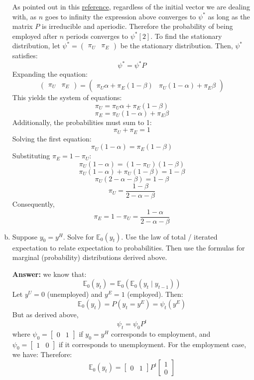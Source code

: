 \documentclass[11pt]{extarticle}
\theoremstyle{plain}
\theoremstyle{definition}
\begin{document}
\begin{enumerate}[(a)]
As pointed out in this \href{https://math.stackexchange.com/questions/588251/proof-that-markov-chains-converges-to-the-stationary-distribution}{reference}, regardless of the initial vector we are dealing with, as $n$ goes to infinity the expression above converges to $\psi^*$ as long as the matrix $P$ is irreducible and aperiodic. Therefore the probability of being employed after $n$ periods converges to $\psi^*[2]$. To find the stationary distribution, let $\psi^* = \begin{pmatrix} \pi_U & \pi_E \end{pmatrix}$ be the stationary distribution. Then, $\psi^*$ satisfies:
    \[
    \psi^* = \psi^* P
    \]
    Expanding the equation:
    \[
    \begin{pmatrix} \pi_U & \pi_E \end{pmatrix} = \begin{pmatrix} \pi_U \alpha + \pi_E (1 - \beta) & \pi_U (1 - \alpha) + \pi_E \beta \end{pmatrix}
    \]
    This yields the system of equations:
    \[
    \pi_U = \pi_U \alpha + \pi_E (1 - \beta)
    \]
    \[
    \pi_E = \pi_U (1 - \alpha) + \pi_E \beta
    \]
    Additionally, the probabilities must sum to 1:
    \[
    \pi_U + \pi_E = 1
    \]
    Solving the first equation:
    \[
    \pi_U (1 - \alpha) = \pi_E (1 - \beta)
    \]
    Substituting $\pi_E = 1 - \pi_U$:
    \[
    \pi_U (1 - \alpha) = (1 - \pi_U) (1 - \beta)
    \]
    \[
    \pi_U (1 - \alpha) + \pi_U (1 - \beta) = 1 - \beta
    \]
    \[
    \pi_U (2 - \alpha - \beta) = 1 - \beta
    \]
    \[
    \pi_U = \frac{1 - \beta}{2 - \alpha - \beta}
    \]
    Consequently,
    \[
    \pi_E = 1 - \pi_U = \frac{1 - \alpha}{2 - \alpha - \beta}
    \]

\item Suppose $y_0 = y^H$. Solve for $\mathbb E_0 (y_t)$. Use the law of total / iterated expectation to relate expectation to probabilities. Then use the formulas for marginal (probability) distributions derived above. 

\textbf{Answer:} we know that:
   \[
   \mathbb{E}_0(y_t) = \mathbb{E}_0\left( \mathbb{E}_0(y_t \mid y_{t-1}) \right)
   \]
Let \( y^U = 0 \) (unemployed) and \( y^E = 1 \) (employed). Then:
   \[
   \mathbb{E}_0(y_t) = P(y_t = y^E) = \psi_t(y^E)
   \]
But as derived above,
   \[
   \psi_t = \psi_0 P^t
   \]
   where \( \psi_0 = \begin{bmatrix} 0 & 1 \end{bmatrix} \) if \( y_0 = y^H \) corresponds to employment, and \( \psi_0 = \begin{bmatrix} 1 & 0 \end{bmatrix} \) if it corresponds to unemployment. For the employment case, we have:
Therefore:
   \[
   \mathbb{E}_0(y_t) = \begin{bmatrix} 0 & 1 \end{bmatrix} P^t \begin{bmatrix} 1 \\ 0 \end{bmatrix}
   \]






\end{enumerate}
\end{document}
